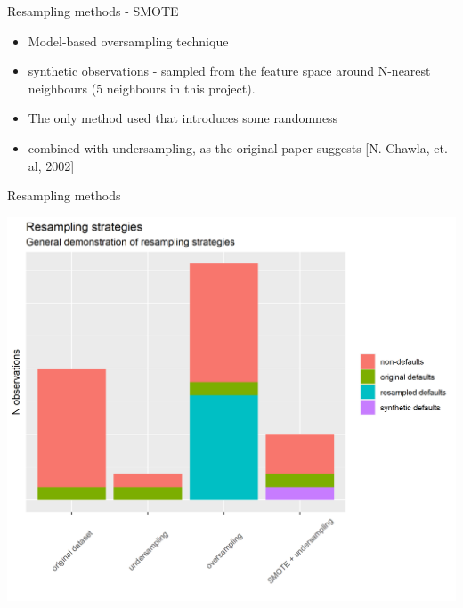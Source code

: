 \documentclass{beamer}
\begin{document}
\begin{frame}{Resampling methods - SMOTE}
\begin{itemize}
\item Model-based oversampling technique
\item synthetic observations - sampled from the feature space around N-nearest neighbours (5 neighbours in this project). 
\item The only method used that introduces some randomness
\item combined with undersampling, as the original paper suggests [N. Chawla, et. al, 2002]
\end{itemize}
\end{frame}

\begin{frame}{Resampling methods}
\begin{center}
\includegraphics[scale=0.5]{img/resampling_strat.png}
\end{center}
\end{frame}
\end{document}
